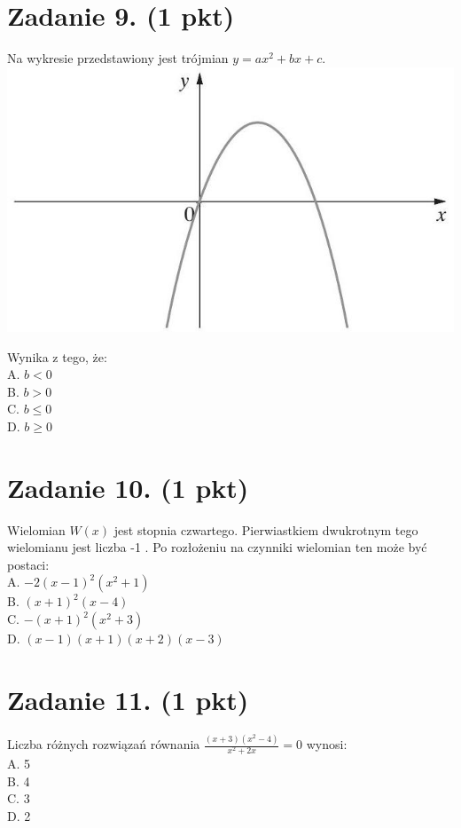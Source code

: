 \documentclass[10pt]{article}
\begin{document}
\section*{Zadanie 9. (1 pkt)}
Na wykresie przedstawiony jest trójmian \(y=a x^{2}+b x+c\).\\
\includegraphics[max width=\textwidth, center]{2024_11_21_769d5953f978b92e06f5g-04}

Wynika z tego, że:\\
A. \(b<0\)\\
B. \(b>0\)\\
C. \(b \leq 0\)\\
D. \(b \geq 0\)

\section*{Zadanie 10. (1 pkt)}
Wielomian \(W(x)\) jest stopnia czwartego. Pierwiastkiem dwukrotnym tego wielomianu jest liczba -1 . Po rozłożeniu na czynniki wielomian ten może być postaci:\\
A. \(-2(x-1)^{2}\left(x^{2}+1\right)\)\\
B. \((x+1)^{2}(x-4)\)\\
C. \(-(x+1)^{2}\left(x^{2}+3\right)\)\\
D. \((x-1)(x+1)(x+2)(x-3)\)

\section*{Zadanie 11. (1 pkt)}
Liczba różnych rozwiązań równania \(\frac{(x+3)\left(x^{2}-4\right)}{x^{2}+2 x}=0\) wynosi:\\
A. 5\\
B. 4\\
C. 3\\
D. 2
\end{document}
